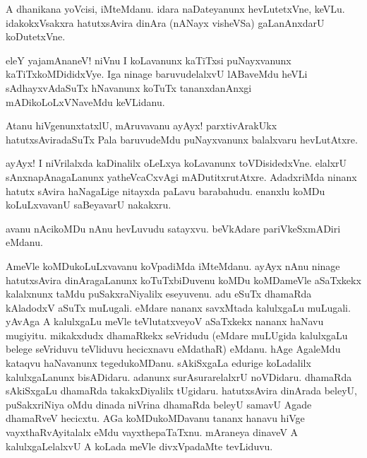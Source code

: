 \documentclass{article}
\begin{document}
\begin{mng}%
A dhanikana yoVcisi, iMteMdanu. idara naDateyanunx hevLutetxVne,
keVLu. idakokxVsakxra  hatutxsAvira dinAra (nANayx visheVSa) gaLanAnxdarU
koDutetxVne.
\end{mng}

\begin{mng}%
eleY yajamAnaneV! niVnu I koLavanunx kaTiTxsi puNayxvanunx
kaTiTxkoMDididxVye. Iga ninage baruvudelalxvU lABaveMdu heVLi sAdhayxvAdaSuTx
hNavanunx koTuTx tananxdanAnxgi mADikoLoLxVNaveMdu keVLidanu.
\end{mng}

\begin{mng}%
Atanu hiVgenunxtatxlU, mAruvavanu ayAyx! parxtivArakUkx
hatutxsAviradaSuTx Pala baruvudeMdu puNayxvanunx balalxvaru hevLutAtxre.
\end{mng}

\begin{mng}%
ayAyx! I niVrilalxda kaDinalilx oLeLxya koLavanunx toVDisidedxVne.
elalxrU sAnxnapAnagaLanunx yatheVcaCxvAgi mADutitxrutAtxre. AdadxriMda
ninanx hatutx sAvira haNagaLige nitayxda paLavu barabahudu. enanxlu koMDu
koLuLxvavanU saBeyavarU nakakxru.
\end{mng}

\begin{mng}%
avanu nAcikoMDu nAnu hevLuvudu satayxvu. beVkAdare
pariVkeSxmADiri eMdanu.
\end{mng}

\begin{mng}%
AmeVle koMDukoLuLxvavanu koVpadiMda iMteMdanu.
ayAyx nAnu ninage hatutxsAvira dinAragaLanunx koTuTxbiDuvenu koMDu
koMDameVle aSaTxkekx kalalxnunx taMdu puSakxraNiyalilx eseyuvenu. adu
eSuTx dhamaRda kAladodxV aSuTx muLugali. eMdare nananx savxMtada kalulxgaLu
muLugali. yAvAga A kalulxgaLu meVle teVlutatxveyoV aSaTxkekx nananx
haNavu mugiyitu. mikakxdudx dhamaRkekx seVridudu (eMdare muLUgida kalulxgaLu
belege seVriduvu teVliduvu hecicxnavu eMdathaR) eMdanu. hAge
AgaleMdu kataqvu haNavanunx tegedukoMDanu. sAkiSxgaLa edurige koLadalilx
kalulxgaLanunx bisADidaru. adanunx surAsurarelalxrU noVDidaru. dhamaRda
sAkiSxgaLu dhamaRda takakxDiyalilx tUgidaru. hatutxsAvira dinArada beleyU,
puSakxriNiya oMdu dinada niVrina dhamaRda beleyU samavU Agade dhamaRveV
hecicxtu. AGa koMDukoMDavanu tananx hanavu hiVge vayxthaRvAyitalalx
eMdu vayxthepaTaTxnu. mAraneya dinaveV A kalulxgaLelalxvU A koLada meVle
divxVpadaMte tevLiduvu.
\end{mng}
\end{document}
